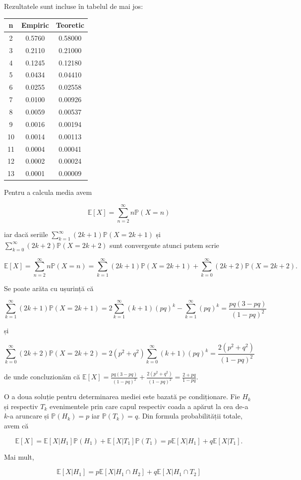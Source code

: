 \documentclass[]{article}
\begin{document}
Rezultatele sunt incluse în tabelul de mai jos:

\begin{longtable}[]{@{}ccc@{}}
\toprule
n & Empiric & Teoretic\tabularnewline
\midrule
\endhead
2 & 0.5760 & 0.58000\tabularnewline
3 & 0.2110 & 0.21000\tabularnewline
4 & 0.1245 & 0.12180\tabularnewline
5 & 0.0434 & 0.04410\tabularnewline
6 & 0.0255 & 0.02558\tabularnewline
7 & 0.0100 & 0.00926\tabularnewline
8 & 0.0059 & 0.00537\tabularnewline
9 & 0.0016 & 0.00194\tabularnewline
10 & 0.0014 & 0.00113\tabularnewline
11 & 0.0004 & 0.00041\tabularnewline
12 & 0.0002 & 0.00024\tabularnewline
13 & 0.0001 & 0.00009\tabularnewline
\bottomrule
\end{longtable}

Pentru a calcula media avem

\[
  \mathbb{E}[X] = \sum_{n=2}^{\infty}n\mathbb{P}(X=n) 
\]

iar dacă seriile \(\sum_{k=1}^{\infty}(2k+1)\mathbb{P}(X=2k+1)\) și
\(\sum_{k=0}^{\infty}(2k+2)\mathbb{P}(X=2k+2)\) sunt convergente atunci
putem scrie

\[
  \mathbb{E}[X] = \sum_{n=2}^{\infty}n\mathbb{P}(X=n) = \sum_{k=1}^{\infty}(2k+1)\mathbb{P}(X=2k+1) + \sum_{k=0}^{\infty}(2k+2)\mathbb{P}(X=2k+2).
\]

Se poate arăta cu ușurință că

\[
  \sum_{k=1}^{\infty}(2k+1)\mathbb{P}(X=2k+1) = 2\sum_{k=1}^{\infty}(k+1)(pq)^k - \sum_{k=1}^{\infty}(pq)^k = \frac{pq(3-pq)}{(1-pq)^2}
\]

și

\[
  \sum_{k=0}^{\infty}(2k+2)\mathbb{P}(X=2k+2) = 2(p^2+q^2)\sum_{k=0}^{\infty}(k+1)(pq)^k = \frac{2(p^2+q^2)}{(1-pq)^2}
\]

de unde concluzionăm că
\(\mathbb{E}[X] = \frac{pq(3-pq)}{(1-pq)^2} + \frac{2(p^2+q^2)}{(1-pq)^2} = \frac{2+pq}{1-pq}\).

O a doua soluție pentru determinarea mediei este bazată pe condiționare.
Fie \(H_k\) și respectiv \(T_k\) evenimentele prin care capul respectiv
coada a apărut la cea de-a \(k\)-a aruncare și \(\mathbb{P}(H_k) = p\)
iar \(\mathbb{P}(T_k) = q\). Din formula probabilității totale, avem că

\[
  \mathbb{E}[X] = \mathbb{E}[X|H_1]\mathbb{P}(H_1) + \mathbb{E}[X|T_1]\mathbb{P}(T_1) = p\mathbb{E}[X|H_1] + q\mathbb{E}[X|T_1].
\]

Mai mult,

\[
  \mathbb{E}[X|H_1] = p\mathbb{E}[X|H_1\cap H_2] + q\mathbb{E}[X|H_1\cap T_2]
\]
\end{document}
